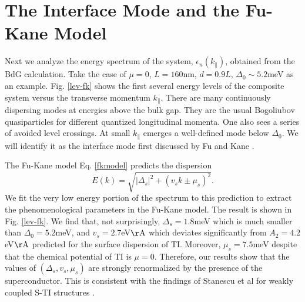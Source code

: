 \section{The Interface Mode and the Fu-Kane Model}

Next we analyze the energy spectrum of the system, $\epsilon_n(k_\parallel)$,
obtained from the BdG calculation. 
Take the case of $\mu=0$, $L=160$nm, $d=0.9L$, $\Delta_0\sim 5.2$meV as an example.
Fig. \ref{lev-fk} shows the first several energy levels of the composite
system versus the transverse momentum $k_\parallel$. There are many continuously
dispersing modes at energies above the bulk gap. They are the usual Bogoliubov
quasiparticles for different quantized longitudinal momenta.
One also sees a series of avoided level crossings.
At small $k_\parallel$ emerges a well-defined mode below $\Delta_0$. We will 
identify it as the interface mode first discussed by Fu and Kane \cite{f-k}.

The Fu-Kane model Eq. \eqref{fkmodel} predicts the dispersion 
\begin{equation}
E(k)=\sqrt{|\Delta_s|^2+(v_sk \pm\mu_s)^2}.
\end{equation}
We fit the very low energy portion of the spectrum to this prediction to
extract the phenomenological parameters in the Fu-Kane model. The result
is shown in Fig. \ref{lev-fk}. We find that,
not surprisingly, $\Delta_s=1.8$meV which is much smaller than $\Delta_0=5.2$meV, and 
$v_s=2.7$eV$\mathrm{\AA}$ which deviates significantly 
from $A_2=4.2$eV$\mathrm{\AA}$ predicted for the surface 
dispersion of TI. Moreover, $\mu_s=7.5$meV despite that the chemical potential
of TI is $\mu=0$. Therefore, our results show that the values of $(\Delta_s,v_s,\mu_s)$
are strongly renormalized by the presence of the superconductor. This is consistent 
with the findings of Stanescu et al for weakly coupled S-TI structures \cite{stan}. 


